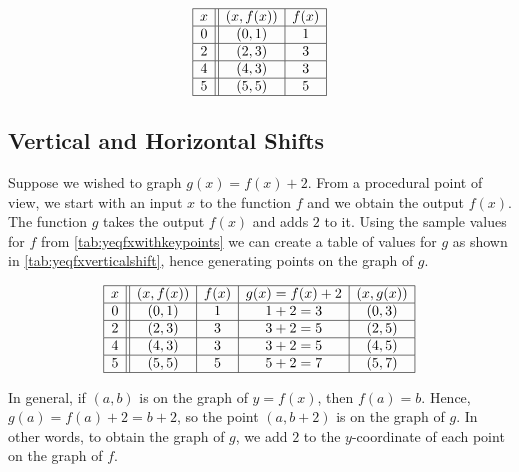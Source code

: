 \begin{mtable}
\[ \begin{array}{|c||c|c|}  

\hline

 x & (x,f(x)) & f(x)  \\ \hline
0  & (0,1)& 1  \\  \hline
2 & (2,3) & 3  \\  \hline
4 & (4,3) & 3  \\  \hline
5 & (5,5) & 5 \\  \hline

\end{array} \] 

\label{tab:yeqfxwithkeypoints}

\end{mtable}

\subsection{Vertical and Horizontal Shifts}
\label{shifts}

Suppose we wished to graph $g(x) = f(x) + 2$.  From a procedural point of view,  we start with an input $x$ to the function $f$ and we obtain the output $f(x)$.  The function $g$ takes the output $f(x)$ and adds $2$ to it.  Using the sample values for $f$ from \autoref{tab:yeqfxwithkeypoints} we can create a table of values for $g$ as shown in \autoref{tab:yeqfxverticalshift}, hence generating points on the graph of $g$.

\begin{itable}

\[ \begin{array}{|c||c|c|c|c|}  

\hline

 x & (x,f(x)) & f(x) & g(x)=f(x)+2 & (x, g(x)) \\ \hline
0  & (0,1)& 1 & 1+2 = 3 &(0, 3) \\  \hline
2 & (2,3) & 3 & 3 + 2 =  5 &(2,5) \\  \hline
4 & (4,3) & 3 & 3 + 2 =  5 &(4, 5) \\  \hline
5 & (5,5) & 5 & 5+2 =  7 &( 5 ,7) \\  \hline

\end{array} \] 

\caption{}
\label{tab:yeqfxverticalshift}
\end{itable}

In general,  if $(a,b)$ is on the graph of $y=f(x)$, then $f(a) = b$. Hence, $g(a) = f(a) +2 = b+2$, so the point $(a,b+2)$ is on the graph of $g$. In other words, to obtain the graph of $g$, we add $2$ to the $y$-coordinate of each point on the graph of $f$.  


